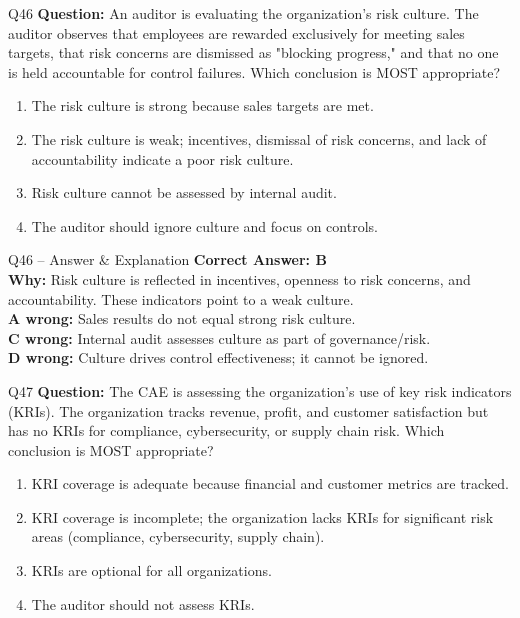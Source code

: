 \documentclass[aspectratio=169,10pt]{beamer}
\begin{document}
	\begin{frame}[t]{Q46}
		\small
		\textbf{Question:} An auditor is evaluating the organization's risk culture. The auditor observes that employees are rewarded exclusively for meeting sales targets, that risk concerns are dismissed as "blocking progress," and that no one is held accountable for control failures. Which conclusion is MOST appropriate?
		\begin{enumerate}[label=\Alph*.,itemsep=1pt,topsep=2pt]
			\item The risk culture is strong because sales targets are met.
			\item The risk culture is weak; incentives, dismissal of risk concerns, and lack of accountability indicate a poor risk culture.
			\item Risk culture cannot be assessed by internal audit.
			\item The auditor should ignore culture and focus on controls.
		\end{enumerate}
	\end{frame}
	
	\begin{frame}[t]{Q46 -- Answer \& Explanation}
		\small
		\textbf{Correct Answer: B} \\[4pt]
		\textbf{Why:} Risk culture is reflected in incentives, openness to risk concerns, and accountability. These indicators point to a weak culture. \\[4pt]
		\textbf{A wrong:} Sales results do not equal strong risk culture. \\[2pt]
		\textbf{C wrong:} Internal audit assesses culture as part of governance/risk. \\[2pt]
		\textbf{D wrong:} Culture drives control effectiveness; it cannot be ignored.
	\end{frame}
	
	\begin{frame}[t]{Q47}
		\small
		\textbf{Question:} The CAE is assessing the organization's use of key risk indicators (KRIs). The organization tracks revenue, profit, and customer satisfaction but has no KRIs for compliance, cybersecurity, or supply chain risk. Which conclusion is MOST appropriate?
		\begin{enumerate}[label=\Alph*.,itemsep=1pt,topsep=2pt]
			\item KRI coverage is adequate because financial and customer metrics are tracked.
			\item KRI coverage is incomplete; the organization lacks KRIs for significant risk areas (compliance, cybersecurity, supply chain).
			\item KRIs are optional for all organizations.
			\item The auditor should not assess KRIs.
		\end{enumerate}
	\end{frame}
	
\end{document}

